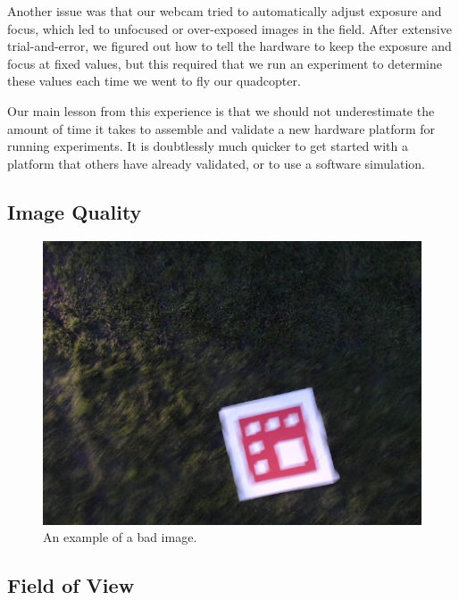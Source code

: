 \documentclass[10pt]{scrartcl} %
\begin{document}
Another issue was that our webcam tried to automatically adjust exposure and
focus, which led to unfocused or over-exposed images in the field. After
extensive trial-and-error, we figured out how to tell the hardware to keep the
exposure and focus at fixed values, but this required that we run an experiment
to determine these values each time we went to fly our quadcopter.

Our main lesson from this experience is that we should not underestimate the
amount of time it takes to assemble and validate a new hardware platform for
running experiments. It is doubtlessly much quicker to get started with a
platform that others have already validated, or to use a software simulation.

\subsection{Image Quality}

\begin{figure}[h]
    \centering
    \includegraphics[width=\textwidth]{images/badimage.jpg}
    \caption{An example of a bad image.}
    \label{fig:badimage}
\end{figure}

\subsection{Field of View}

\end{document}
